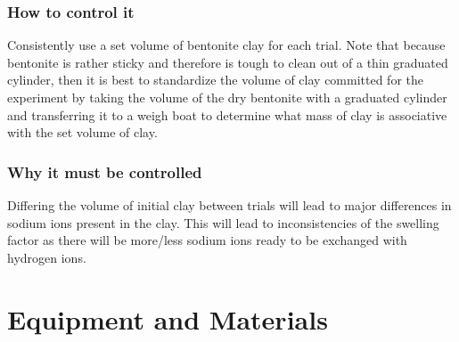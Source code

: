 \documentclass[11pt, letterpaper]{article}
\begin{document}
\subsubsection{How to control it}
Consistently use a set volume of bentonite clay for each trial. Note
that because bentonite is rather sticky and therefore is tough
to clean out of a thin graduated cylinder, then it is best to
standardize the volume of clay committed for the experiment
by taking the volume of the dry bentonite with a graduated cylinder
and transferring it to a weigh boat to determine what mass of clay
is associative with the set volume of clay.
\subsubsection{Why it must be controlled}
Differing the volume of initial clay between trials will lead to
major differences in sodium ions present in the clay. This will
lead to inconsistencies of the swelling factor as there will
be more/less sodium ions ready to be exchanged with
hydrogen ions.



\section{Equipment and Materials}
\end{document}
